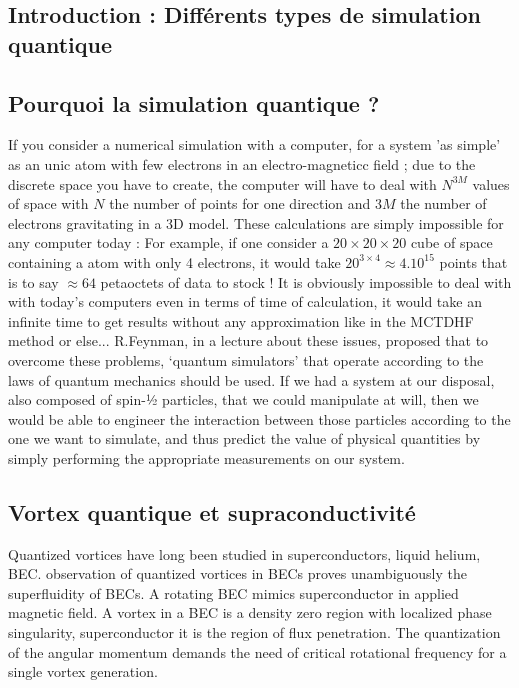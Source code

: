 \documentclass[a4paper]{article}
\begin{document}
\begin{multicols}{2}


\section{Introduction : Différents types de simulation quantique} 
\subsection*{Pourquoi la simulation quantique ?}

If you consider a numerical simulation with a computer, for a system 'as simple' as an unic atom with few electrons in an electro-magneticc field ; due to the discrete space you have to create, the computer will have to deal with $N^{3M}$ values of space with $N$ the number of points for one direction and $3M$ the number of electrons gravitating in a 3D model. These calculations are simply impossible for any computer today : For example, if one consider a $20 \times 20 \times 20$ cube of space containing a atom with only 4 electrons, it would take $20^{3 \times 4} \approx 4.10^{15}$ points that is to say $\approx 64$ petaoctets of data to stock !  It is obviously impossible to deal with with today's computers even in terms of time of calculation, it would take an infinite time to get results without any approximation like in the MCTDHF method or else... %
R.Feynman, in a lecture about these issues, proposed that to overcome these problems, ‘quantum simulators’ that operate according to the laws of quantum mechanics should be used. If we had a system at our disposal, also composed of spin-½ particles, that we could manipulate at will, then we would be able to engineer the interaction between those particles according to the one we want to simulate, and thus predict the value of physical quantities by simply performing the appropriate measurements on our system. %

\subsection*{Vortex quantique et supraconductivité}
Quantized vortices have long been studied in superconductors, liquid helium, BEC. observation of quantized vortices in BECs proves unambiguously the superfluidity of BECs. A rotating BEC mimics superconductor in applied magnetic field. A vortex in a BEC is a density zero region with localized phase singularity, superconductor it is the region of flux penetration. The quantization of the angular momentum demands the need of critical rotational frequency for a single vortex generation.



\end{multicols}
\end{document}
